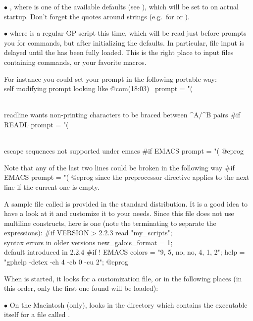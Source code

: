 $\bullet$  \kbd{=} , where  is one of
the available defaults (see ), which will be set to
 on actual startup. Don't forget the quotes around strings
(e.g.~for  or ).

$\bullet$  where 
is a regular GP script this time, which will be read just before  prompts
you for commands, but after initializing the defaults. In particular, file
input is delayed until the  has been fully loaded. This is the
right place to input files containing  commands, or your favorite
macros.

\noindent For instance you could set your prompt in the following portable way:
\bprog
\\ self modifying prompt looking like @com\hbox{\rm(18:03) \kbd{ >}}
prompt   = "(%

\\ readline wants non-printing characters to be braced between ^A/^B pairs
#if READL prompt = "(%

\\ escape sequences not supported under emacs
#if EMACS prompt = "(%
@eprog

\noindent Note that any of the last two lines could be broken in the
following way
\bprog
#if EMACS
  prompt = "(%
@eprog
\noindent since the preprocessor directive applies to the next line if the
current one is empty.

A sample  file called  is provided in the
standard distribution. It is a good idea to have a look at it and customize
it to your needs. Since this file does not use multiline constructs, here is
one (note the terminating \kbd{;} to separate the expressions):
\bprog
#if VERSION > 2.2.3
{
  read "my_scripts";     \\ syntax errors in older versions
  new_galois_format = 1; \\ default introduced in 2.2.4
}
#if ! EMACS
{
  colors = "9, 5, no, no, 4, 1, 2";
  help   = "gphelp -detex -ch 4 -cb 0 -cu 2";
}
@eprog

When  is started, it looks for a customization file, or  in the
following places (in this order, only the first one found will be loaded):

\noindent$\bullet$ On the Macintosh (only),  looks in the directory
which contains the  executable itself for a file called .

